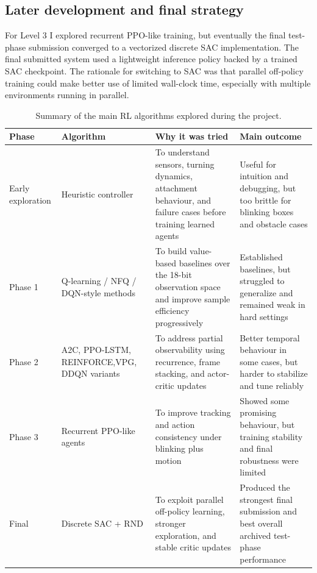\documentclass[11pt,oneside]{article}
\begin{document}
\subsection*{Later development and final strategy}
For Level 3 I explored recurrent PPO-like training, but eventually the final test-phase submission converged to a vectorized discrete SAC implementation. The final submitted system used a lightweight inference policy backed by a trained SAC checkpoint. The rationale for switching to SAC was that parallel off-policy training could make better use of limited wall-clock time, especially with multiple environments running in parallel.

\begin{table}[h]
\centering
\small
\caption{Summary of the main RL algorithms explored during the project.}
\begin{tabular}{p{1.3cm}p{2.5cm}p{4.4cm}p{4.2cm}}
\toprule
Phase & Algorithm & Why it was tried & Main outcome \\
\midrule
Early exploration & Heuristic controller & To understand sensors, turning dynamics, attachment behaviour, and failure cases before training learned agents & Useful for intuition and debugging, but too brittle for blinking boxes and obstacle cases \\
Phase 1 & Q-learning / NFQ / DQN-style methods & To build value-based baselines over the 18-bit observation space and improve sample efficiency progressively & Established baselines, but struggled to generalize and remained weak in hard settings \\
Phase 2 & A2C, PPO-LSTM, REINFORCE,VPG, DDQN variants & To address partial observability using recurrence, frame stacking, and actor-critic updates & Better temporal behaviour in some cases, but harder to stabilize and tune reliably \\
Phase 3 & Recurrent PPO-like agents & To improve tracking and action consistency under blinking plus motion & Showed some promising behaviour, but training stability and final robustness were limited \\
Final & Discrete SAC + RND & To exploit parallel off-policy learning, stronger exploration, and stable critic updates & Produced the strongest final submission and best overall archived test-phase performance \\
\bottomrule
\end{tabular}
\end{table}
\end{document}
